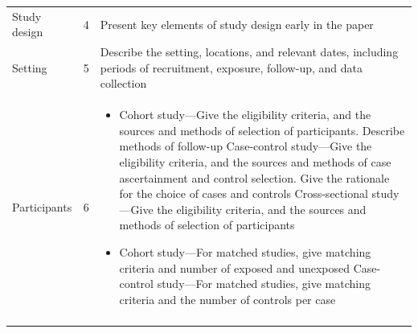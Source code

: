 \documentclass[]{book}
\providecommand{\tightlist}{%
  \setlength{\itemsep}{0pt}\setlength{\parskip}{0pt}}
\begin{document}
\begin{longtable}[]{@{}lll@{}}
\begin{minipage}[t]{0.34\columnwidth}\raggedright
Study design\strut
\end{minipage} & \begin{minipage}[t]{0.17\columnwidth}\raggedright
4\strut
\end{minipage} & \begin{minipage}[t]{0.40\columnwidth}\raggedright
Present key elements of study
design early in the paper\strut
\end{minipage}\tabularnewline
\begin{minipage}[t]{0.34\columnwidth}\raggedright
Setting\strut
\end{minipage} & \begin{minipage}[t]{0.17\columnwidth}\raggedright
5\strut
\end{minipage} & \begin{minipage}[t]{0.40\columnwidth}\raggedright
Describe the setting,
locations, and relevant dates,
including periods of
recruitment, exposure,
follow-up, and data collection\strut
\end{minipage}\tabularnewline
\begin{minipage}[t]{0.34\columnwidth}\raggedright
Participants\strut
\end{minipage} & \begin{minipage}[t]{0.17\columnwidth}\raggedright
6\strut
\end{minipage} & \begin{minipage}[t]{0.40\columnwidth}\raggedright
\begin{itemize}
\tightlist
\item
  Cohort study---Give the
  eligibility criteria, and the
  sources and methods of
  selection of participants.
  Describe methods of follow-up
  Case-control study---Give the
  eligibility criteria, and the
  sources and methods of case
  ascertainment and control
  selection. Give the rationale
  for the choice of cases and
  controls
  Cross-sectional study---Give
  the eligibility criteria, and
  the sources and methods of
  selection of participants
\item
  Cohort study---For matched
  studies, give matching
  criteria and number of exposed
  and unexposed
  Case-control study---For
  matched studies, give matching
  criteria and the number of
  controls per case
\end{itemize}\strut
\end{minipage}\tabularnewline
\begin{minipage}[t]{0.34\columnwidth}\raggedright

\end{minipage}
\end{longtable}
\end{document}
